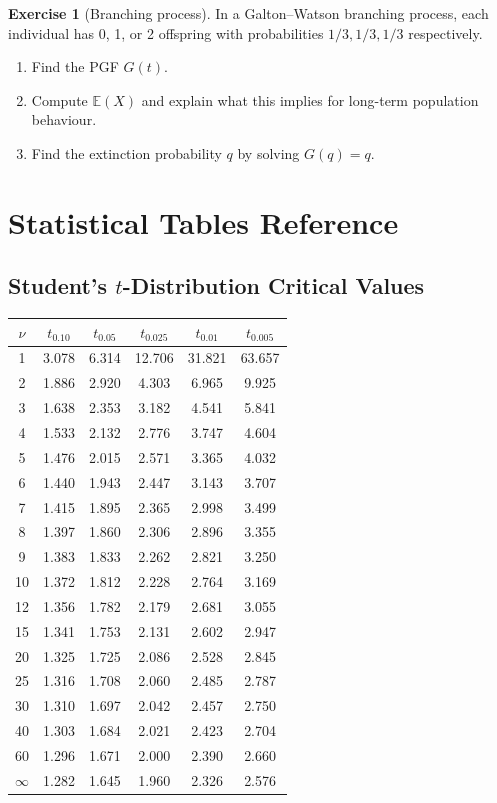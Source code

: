 \documentclass[12pt, a4paper, oneside]{book}
\theoremstyle{definition}
\newtheorem{exercise}{Exercise}[section]
\theoremstyle{plain}
\theoremstyle{remark}
\newcommand{\E}{\mathbb{E}}
\begin{document}
\begin{exercise}[Branching process]
In a Galton--Watson branching process, each individual has 0, 1, or 2
offspring with probabilities $1/3, 1/3, 1/3$ respectively.
\begin{enumerate}[label=\textbf{(\alph*)}]
  \item Find the PGF $G(t)$.
  \item Compute $\E(X)$ and explain what this implies for long-term
        population behaviour.
  \item Find the extinction probability $q$ by solving $G(q)=q$.
\end{enumerate}
\end{exercise}

\appendix
\chapter{Statistical Tables Reference}

\section{Student's $t$-Distribution Critical Values}

\begin{center}
\begin{tabular}{cccccc}
\toprule
$\nu$ & $t_{0.10}$ & $t_{0.05}$ & $t_{0.025}$ & $t_{0.01}$ & $t_{0.005}$ \\
\midrule
1  & 3.078 & 6.314 & 12.706 & 31.821 & 63.657 \\
2  & 1.886 & 2.920 & 4.303  & 6.965  & 9.925  \\
3  & 1.638 & 2.353 & 3.182  & 4.541  & 5.841  \\
4  & 1.533 & 2.132 & 2.776  & 3.747  & 4.604  \\
5  & 1.476 & 2.015 & 2.571  & 3.365  & 4.032  \\
6  & 1.440 & 1.943 & 2.447  & 3.143  & 3.707  \\
7  & 1.415 & 1.895 & 2.365  & 2.998  & 3.499  \\
8  & 1.397 & 1.860 & 2.306  & 2.896  & 3.355  \\
9  & 1.383 & 1.833 & 2.262  & 2.821  & 3.250  \\
10 & 1.372 & 1.812 & 2.228  & 2.764  & 3.169  \\
12 & 1.356 & 1.782 & 2.179  & 2.681  & 3.055  \\
15 & 1.341 & 1.753 & 2.131  & 2.602  & 2.947  \\
20 & 1.325 & 1.725 & 2.086  & 2.528  & 2.845  \\
25 & 1.316 & 1.708 & 2.060  & 2.485  & 2.787  \\
30 & 1.310 & 1.697 & 2.042  & 2.457  & 2.750  \\
40 & 1.303 & 1.684 & 2.021  & 2.423  & 2.704  \\
60 & 1.296 & 1.671 & 2.000  & 2.390  & 2.660  \\
$\infty$ & 1.282 & 1.645 & 1.960 & 2.326 & 2.576 \\
\bottomrule
\end{tabular}
\end{center}
\end{document}
